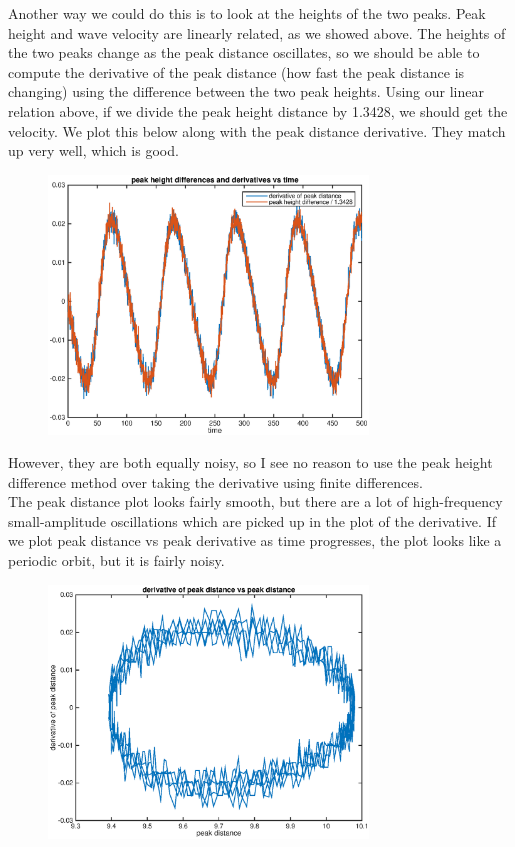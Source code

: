 \documentclass[12pt]{article}
\begin{document}
Another way we could do this is to look at the heights of the two peaks. Peak height and wave velocity are linearly related, as we showed above. The heights of the two peaks change as the peak distance oscillates, so we should be able to compute the derivative of the peak distance (how fast the peak distance is changing) using the difference between the two peak heights. Using our linear relation above, if we divide the peak height distance by 1.3428, we should get the velocity. We plot this below along with the peak distance derivative. They match up very well, which is good.
\begin{figure}[H]
	\includegraphics[width=8.5cm]{peakhtdiff}
\end{figure}
However, they are both equally noisy, so I see no reason to use the peak height difference method over taking the derivative using finite differences.\\

The peak distance plot looks fairly smooth, but there are a lot of high-frequency small-amplitude oscillations which are picked up in the plot of the derivative. If we plot peak distance vs peak derivative as time progresses, the plot looks like a periodic orbit, but it is fairly noisy.

\begin{figure}[H]
	\includegraphics[width=8.5cm]{peakderivdist}
\end{figure}
\end{document}
